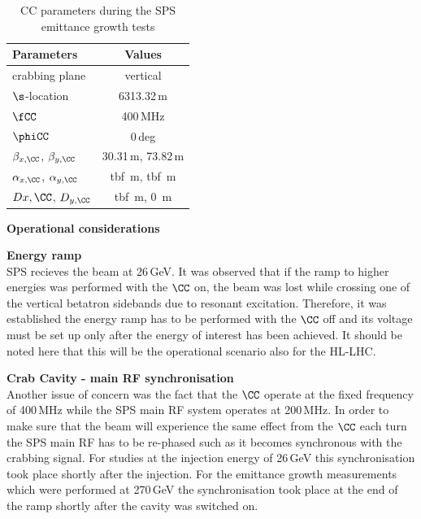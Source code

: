 \begin{table}[!hbt]
   \centering
   \caption{CC parameters during the SPS emittance growth tests}
   \begin{tabular}{lc}
       \toprule
       \textbf{Parameters} & \textbf{Values}\\
       \bottomrule
       crabbing plane & vertical \\
       $\s$-location & 6313.32\,m \\
      $\fCC$  & 400\,MHz   \\ 
      $\phiCC$  & 0\,deg   \\ 
      \bottomrule
      $\beta_{x, \CC}$, $\beta_{y, \CC}$  & 30.31\,m,  73.82\,m \\
      $\alpha_{x, \CC}$, $\alpha_{y, \CC}$  & tbf \,m,  tbf \,m \\
      $D{x, \CC}$, $D_{y, \CC}$  & tbf \,m,  0 \,m \\     
      \bottomrule
   \end{tabular}
   \label{tab:SPS_CCs}
\end{table}

\large{\textbf{Operational considerations}}

\normalsize{\textbf{Energy ramp}}\\
SPS recieves the beam at 26\,GeV. It was observed that if the ramp to higher energies was performed with the $\CC$ on, the beam was lost while crossing one of the vertical betatron sidebands due to resonant excitation. Therefore, it was established the energy ramp has to be performed with the $\CC$ off and its voltage must be set up only after the energy of interest has been achieved. It should be noted here that this will be the operational scenario also for the HL-LHC.

\normalsize{\textbf{Crab Cavity - main RF synchronisation}}\\
Another issue of concern was the fact that the $\CC$ operate at the fixed frequency of 400\,MHz while the SPS main RF system operates at 200\,MHz.
In order to make sure that the beam will experience the same effect from the $\CC$ each turn the SPS main RF has to be re-phased such as it becomes synchronous with the crabbing signal. For studies at the injection energy of 26\,GeV this synchronisation took place shortly after the injection. For the emittance growth measurements which were performed at 270\,GeV the synchronisation took place at the end of the ramp shortly after the cavity was switched on.

